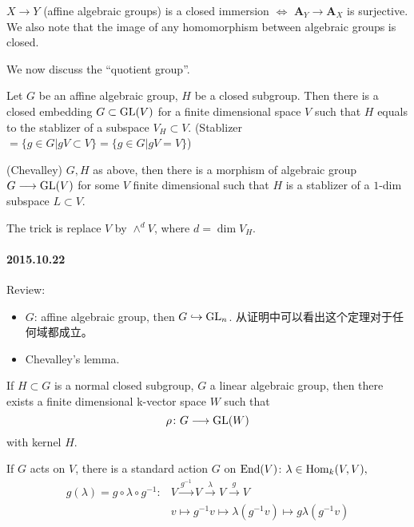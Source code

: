 \begin{remark}
	$X\longrightarrow Y$ (affine algebraic groups) is a closed immersion $\Longleftrightarrow$ $\mathbf{A}_Y\longrightarrow \mathbf{A}_X$ is surjective. We also note that the image of any homomorphism between algebraic groups is closed.
\end{remark}
We now discuss the ``quotient group''.
\begin{corollary}
	Let $G$ be an affine algebraic group, $H$ be a closed subgroup. Then there is a closed embedding $G\subset \operatorname {GL}(V)$ for a finite dimensional space $V$ such that $H$ equals to the stablizer of a subspace $V_H\subset V$. (Stablizer $=\{g\in G|gV\subset V\}=\{g\in G|gV= V\}$)
\end{corollary}
\begin{lemma}(Chevalley)
	$G,H$ as above, then there is a morphism of algebraic group $G\longrightarrow \operatorname {GL}(V)$ for some $V$ finite dimensional such that $H$ is a stablizer of a $1$-dim subspace $L\subset V$.
\end{lemma}
The trick is replace $V$ by $\wedge^d V$, where $d=\dim V_H$.

\paragraph{2015.10.22}
Review:
\begin{itemize} \item $G$: affine algebraic group, then $G\hookrightarrow \operatorname {GL}_n$. 从证明中可以看出这个定理对于任何域都成立。
\item Chevalley's lemma.
\end{itemize}
\begin{theorem}
	If $H\subset G$ is a normal closed subgroup, $G$ a linear algebraic group, then there exists a finite dimensional k-vector space $W$ such that 
	\[\rho \colon G\longrightarrow \operatorname {GL}(W)\]
	with kernel $H$.
\end{theorem}
\begin{remark}
	If $G$ acts on $V$, there is a standard action $G$ on $\mathrm{End}(V)$: $\lambda \in \mathop{\mathrm{Hom}}_k(V,V),$
	\begin{align*}
		g(\lambda)=g\circ \lambda \circ g^{-1} \colon  &V \overset{g^{-1}}\longrightarrow V \overset{\lambda}\longrightarrow V \overset{g}\longrightarrow V \\
		 & v\mapsto g^{-1}v \mapsto \lambda(g^{-1}v)\mapsto g\lambda(g^{-1}v)
	\end{align*}
\end{remark}


